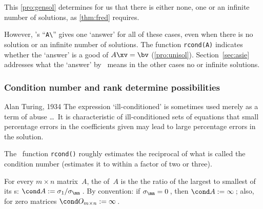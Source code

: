 This \autoref{pro:gensol} determines for us that there is either none, one or an infinite number of solutions, as \autoref{thm:fred} requires.

However,  \script's ``\verb|A\|'' gives one `answer' for all of these cases, even when there is no solution or an infinite number of solutions.
The function \verb|rcond(A)| indicates whether the `answer' is a good  of \(A\xv=\bv\) (\autoref{pro:unisol}).
Section~\ref{sec:asie} addresses what the `answer' by \script\ means in the other cases no or infinite solutions.





\subsubsection{Condition number and rank determine possibilities}

\begin{quoted}{Alan Turing, 1934 \cite[p.131]{Higham1996}}
The expression `ill-conditioned' is sometimes used merely as a term of abuse \ldots\ 
It is characteristic of ill-conditioned sets of equations that small percentage errors in the coefficients given may lead to large percentage errors in the solution.
\end{quoted}

The \script\ function \verb|rcond()| roughly estimates the reciprocal of what is called the condition number (estimates it to within a factor of two or three).
\begin{comment}
Avoid introducing \verb|cond()| as it is expensive to compute in practice, and better learning to reinforce the ratio of singular values.
\end{comment}

\begin{definition} \label{def:condnum}
For every \(m\times n\) matrix~\(A\),
the  of~\(A\) is the the ratio of the largest to smallest of its s: \(\cond A:=\sigma_1/\sigma_{\mn}\)\,. 
By convention: if \(\sigma_{\mn}=0\)\,, then \index{infinity}\(\cond A:=\infty\)\,; 
also, for zero matrices \(\cond O_{m\times n}:=\infty\)\,.
\end{definition}

